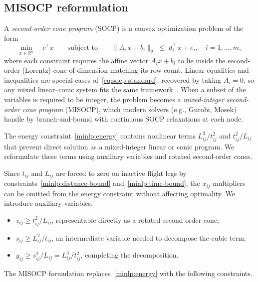 \documentclass[11pt]{article}
\let\originalsubsection\subsection
\renewcommand{\subsection}{\FloatBarrier\originalsubsection}
\begin{document}
\subsection{MISOCP reformulation}\label{subsec:misocp}

A \emph{second-order cone program} (SOCP) is a convex optimization problem of the form
\begin{equation}\label{eq:socp-standard}
\min_{x \in \mathbb{R}^{n}} \quad c^{\top} x \qquad \text{subject to} \qquad \lVert A_i\, x + b_i \rVert_{2} \;\le\; d_i^{\top}\, x + e_i, \quad i = 1, \dots, m,
\end{equation}
where each constraint requires the affine vector $A_i x + b_i$ to lie inside the second-order (Lorentz) cone of dimension matching its row count. Linear equalities and inequalities are special cases of~\eqref{eq:socp-standard}, recovered by taking $A_i = 0$, so any mixed linear–conic system fits the same framework~\cite{boyd2004convex}. When a subset of the variables is required to be integer, the problem becomes a \emph{mixed-integer second-order cone program} (MISOCP), which modern solvers (e.g., Gurobi, Mosek) handle by branch-and-bound with continuous SOCP relaxations at each node.


The energy constraint~\eqref{minlp:energy} contains nonlinear terms $L_{ij}^3/t_{ij}^2$ and $t_{ij}^2/L_{ij}$ that prevent direct solution as a mixed-integer linear or conic program. We reformulate these terms using auxiliary variables and rotated second-order cones.

Since $t_{ij}$ and $L_{ij}$ are forced to zero on inactive flight legs by constraints~\eqref{minlp:distance-bound} and~\eqref{minlp:time-bound}, the $x_{ij}$ multipliers can be omitted from the energy constraint without affecting optimality. We introduce auxiliary variables.
\begin{itemize}
    \item $z_{ij} \ge t_{ij}^2 / L_{ij}$, representable directly as a rotated second-order cone;
    \item $s_{ij} \ge L_{ij}^2 / t_{ij}$, an intermediate variable needed to decompose the cubic term;
    \item $y_{ij} \ge s_{ij}^2 / L_{ij} = L_{ij}^3 / t_{ij}^2$, completing the decomposition.
\end{itemize}

\noindent The MISOCP formulation replaces~\eqref{minlp:energy} with the following constraints.
\end{document}
